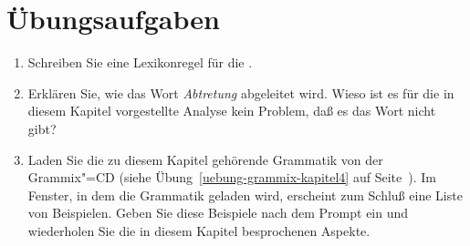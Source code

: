 \section*{Übungsaufgaben}

\begin{enumerate}
\item Schreiben Sie eine Lexikonregel für die \ungn.
\item Erklären Sie, wie das Wort \emph{Abtretung}
 abgeleitet wird.
      Wieso ist es für die in diesem Kapitel vorgestellte Analyse
      kein Problem, daß es das Wort  nicht gibt?

\item Laden Sie die zu diesem Kapitel gehörende Grammatik von der Grammix"=CD
(siehe Übung~\ref{uebung-grammix-kapitel4} auf Seite~\pageref{uebung-grammix-kapitel4}).
Im Fenster, in dem die Grammatik geladen wird, erscheint zum Schluß eine Liste von Beispielen.
Geben Sie diese Beispiele nach dem Prompt ein und wiederholen Sie die in diesem Kapitel besprochenen
Aspekte.

\end{enumerate}




\begin{comment}




van Eynde sagt, daß Affix keine Kategorie beisteuert, da es Adjektivaffixe
geben muß, die an Partizipien gehen.

Diese müssen dann aber disjunktiv ein Verb oder ein Adjektiv selegieren und genauso
könnte man sagen, daß sie disjunktiv ein Adjektiv oder ein Verb sind.























\end{comment}
